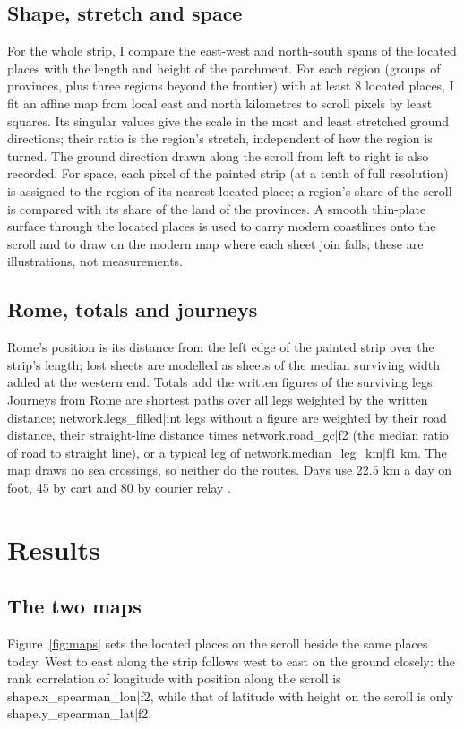 \documentclass[11pt,a4paper]{article}
\begin{document}
\subsection{Shape, stretch and space}
For the whole strip, I compare the east-west and north-south spans of the located places with the length and height of the parchment. For each region (groups of provinces, plus three regions beyond the frontier) with at least 8 located places, I fit an affine map from local east and north kilometres to scroll pixels by least squares. Its singular values give the scale in the most and least stretched ground directions; their ratio is the region's stretch, independent of how the region is turned. The ground direction drawn along the scroll from left to right is also recorded. For space, each pixel of the painted strip (at a tenth of full resolution) is assigned to the region of its nearest located place; a region's share of the scroll is compared with its share of the land of the provinces. A smooth thin-plate surface through the located places is used to carry modern coastlines onto the scroll and to draw on the modern map where each sheet join falls; these are illustrations, not measurements.

\subsection{Rome, totals and journeys}
Rome's position is its distance from the left edge of the painted strip over the strip's length; lost sheets are modelled as sheets of the median surviving width added at the western end. Totals add the written figures of the surviving legs. Journeys from Rome are shortest paths over all legs weighted by the written distance; {{network.legs_filled|int}} legs without a figure are weighted by their road distance, their straight-line distance times {{network.road_gc|f2}} (the median ratio of road to straight line), or a typical leg of {{network.median_leg_km|f1}} km. The map draws no sea crossings, so neither do the routes. Days use 22.5 km a day on foot, 45 by cart and 80 by courier relay \citep{wiki}.

\section{Results}
\subsection{The two maps}
Figure~\ref{fig:maps} sets the located places on the scroll beside the same places today. West to east along the strip follows west to east on the ground closely: the rank correlation of longitude with position along the scroll is {{shape.x_spearman_lon|f2}}, while that of latitude with height on the scroll is only {{shape.y_spearman_lat|f2}}.
\end{document}
